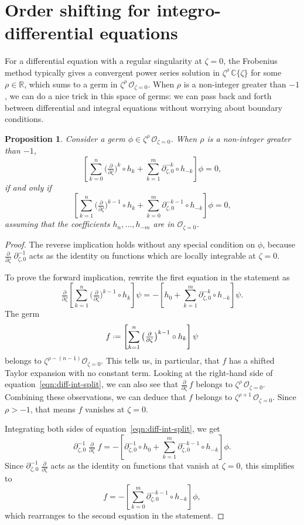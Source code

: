 \documentclass{article}
\newcommand{\R}{\mathbb{R}}
\newcommand{\C}{\mathbb{C}}
\newcommand{\fracderiv}[3]{\partial^{#1}_{#2, #3}}
\newcommand*{\defeq}{\mathrel{\vcenter{\baselineskip0.5ex \lineskiplimit0pt
                     \hbox{\scriptsize.}\hbox{\scriptsize.}}}%
                     =}
\theoremstyle{definition}
\theoremstyle{plain}
\newtheorem{prop}[definition]{Proposition}
\begin{document}
\section{Order shifting for integro-differential equations}\label{shifting}
For a differential equation with a regular singularity at $\zeta = 0$, the Frobenius method typically gives a convergent power series solution in $\zeta^\rho\,\C\{\zeta\}$ for some $\rho \in \R$, which sums to a germ in $\zeta^\rho\,\mathcal{O}_{\zeta=0}$. When $\rho$ is a non-integer greater than $-1$, we can do a nice trick in this space of germs: we can pass back and forth between differential and integral equations without worrying about boundary conditions.
\begin{prop}\label{prop:shifting}
Consider a germ $\phi \in \zeta^\rho\,\mathcal{O}_{\zeta=0}$. When $\rho$ is a non-integer greater than $-1$,
\[ \left[ \sum_{k = 0}^n \big(\tfrac{\partial}{\partial \zeta}\big)^k \circ h_k + \sum_{k = 1}^m \fracderiv{-k}{\zeta}{0} \circ h_{-k} \right] \phi = 0, \]
if and only if
\[ \left[ \sum_{k = 1}^n \big(\tfrac{\partial}{\partial \zeta}\big)^{k-1} \circ h_k + \sum_{k = 0}^m \fracderiv{-k-1}{\zeta}{0} \circ h_{-k} \right] \phi = 0, \]
assuming that the coefficients $h_n, \ldots, h_{-m}$ are in $\mathcal{O}_{\zeta=0}$.
\end{prop}
\begin{proof}
The reverse implication holds without any special condition on $\phi$, because $\tfrac{\partial}{\partial \zeta}\;\fracderiv{-1}{\zeta}{0}$ acts as the identity on functions which are locally integrable at $\zeta = 0$.

To prove the forward implication, rewrite the first equation in the statement as
\begin{equation}\label{eqn:diff-int-split}
\tfrac{\partial}{\partial \zeta} \left[ \sum_{k = 1}^n \big(\tfrac{\partial}{\partial \zeta}\big)^{k-1} \circ h_k \right] \psi = -\left[ h_0 + \sum_{k = 1}^m \fracderiv{-k}{\zeta}{0} \circ h_{-k} \right] \psi.
\end{equation}
The germ
\[ f \defeq \left[ \sum_{k = 1}^n \big(\tfrac{\partial}{\partial \zeta}\big)^{k-1} \circ h_k \right] \psi \]
belongs to $\zeta^{\rho-(n-1)} \mathcal{O}_{\zeta = 0}$. This tells us, in particular, that $f$ has a shifted Taylor expansion with no constant term. Looking at the right-hand side of equation~\eqref{eqn:diff-int-split}, we can also see that $\tfrac{\partial}{\partial \zeta}\,f$ belongs to $\zeta^\rho\,\mathcal{O}_{\zeta=0}$. Combining these observations, we can deduce that $f$ belongs to $\zeta^{\rho+1}\,\mathcal{O}_{\zeta=0}$. Since $\rho > -1$, that means $f$ vanishes at $\zeta = 0$.

Integrating both sides of equation~\eqref{eqn:diff-int-split}, we get
\[ \fracderiv{-1}{\zeta}{0}\;\tfrac{\partial}{\partial \zeta}\;f = -\left[ \fracderiv{-1}{\zeta}{0} \circ h_0 + \sum_{k = 1}^m \fracderiv{-k-1}{\zeta}{0} \circ h_{-k} \right] \phi. \]
Since $\fracderiv{-1}{\zeta}{0}\;\tfrac{\partial}{\partial \zeta}$ acts as the identity on functions that vanish at $\zeta = 0$, this simplifies to
\[ f = -\left[ \sum_{k = 0}^m \fracderiv{-k-1}{\zeta}{0} \circ h_{-k} \right] \phi, \]
which rearranges to the second equation in the statement.
\end{proof}
\newpage


\end{document}
